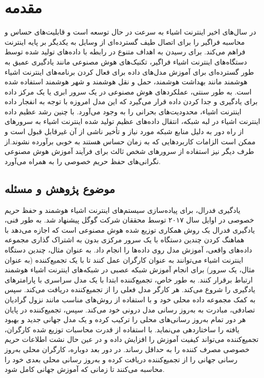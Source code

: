 \chapter{مقدمه}

در سال‌های اخیر اینترنت اشیاء به سرعت در حال توسعه است و قابلیت‌های حساس و محاسبه فراگیر را برای اتصال طیف گسترده‌ای از وسایل به یکدیگر بر پایه اینترنت فراهم می‌کند\cite{b7}. برای رسیدن به اهداف متنوع در رابطه با داده‌های تولید شده توسط دستگاه‌های اینترنت اشیاء فراگیر، تکنیک‌های هوش مصنوعی مانند یادگیری عمیق به طور گسترده‌ای برای آموزش مدل‌های داده برای فعال کردن برنامه‌های  اینترنت اشیاء  هوشمند مانند بهداشت هوشمند، حمل و نقل هوشمند و شهر هوشمند استفاده شده است\cite{b8}. به طور سنتی، عملکردهای هوش مصنوعی در یک سرور ابری یا یک مرکز داده برای یادگیری و جدا کردن داده قرار می‌گیرد که این مدل امروزه با توجه به انفجار داده  اینترنت اشیاء، محدودیت‌های بحرانی را به وجود می‌آورد\cite{a10}. با چنین رشد عظیم داده  اینترنت اشیاء  در لبه شبکه، انتقال داده‌های عظیم تولید شده اینترنت اشیاء به سرور‌های از راه دور به دلیل منابع شبکه مورد نیاز و تأخیر ناشی از آن غیرقابل قبول است و ممکن است الزامات کاربرد‌هایی که به زمان حساس هستند به خوبی برآورده نشوند.از طرف دیگر نیز استفاده از سرور‌های شخص ثالث برای فرآیند آموزش هوش مصنوعی نگرانی‌های حفظ حریم خصوصی را به همراه می‌آورد\cite{book_1}.

\section{موضوع پژوهش و مسئله}

یادگیری فدرال، برای پیاده‌سازی سیستم‌های  اینترنت اشیاء  هوشمند و حفظ حریم خصوصی در اوایل سال ۲۰۱۷ توسط محققان شرکت گوگل پیشنهاد شد\cite{b6}. به طور فنی، یادگیری فدرال یک روش همکاری توزیع شده هوش مصنوعی است که اجازه می‌دهد با هماهنگ کردن چندین دستگاه با یک سرور مرکزی بدون به اشتراک گذاری مجموعه داده‌های واقعی، آموزش مدل روی داده‌ها را انجام داد. به عنوان مثال، چندین دستگاه  اینترنت اشیاء  می‌توانند به عنوان کارگران عمل کنند تا با یک تجمیع‌کننده (به عنوان مثال، یک سرور) برای انجام آموزش شبکه عصبی در شبکه‌های  اینترنت اشیاء  هوشمند ارتباط برقرار کنند. به طور خاص، تجمیع‌کننده ابتدا با یک مدل سراسری با پارامترهای یادگیری را شروع می‌کند. هر کارگر مدل فعلی را از تجمیع‌کننده دریافت می‌کند. سپس به کمک مجموعه داده محلی خود و با استفاده از روش‌های مناسب مانند نزول گرادیان تصادفی، مبادرت به به‌روز رسانی مدل درونی خود می‌کند. سپس، تجمیع‌کننده در پایان هر دور تمام به‌روز رسانی‌های محلی را ترکیب کرده و یک مدل جهانی جدید و بهبود یافته را ساختاردهی می‌نماید. با استفاده از قدرت محاسبات توزیع شده کارگران، تجمیع‌کننده می‌تواند کیفیت آموزش را افزایش داده و در عین حال نشت اطلاعات حریم خصوصی مصرف کننده را به حداقل ‌رساند. در دور بعد دوباره، کارگران محلی به‌روز رسانی جهانی را از تجمیع‌کننده دریافت کرده و به‌روز رسانی محلی بعدی خود را محاسبه می‌کنند تا زمانی که آموزش جهانی کامل شود. 

